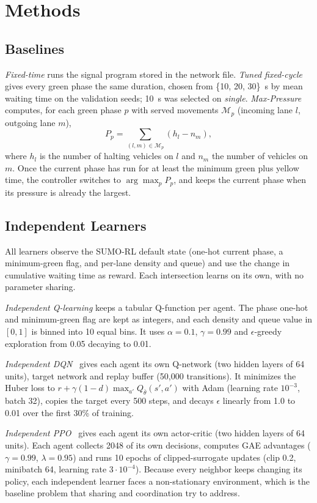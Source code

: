 \documentclass[conference]{IEEEtran}
\begin{document}
\section{Methods}
\label{sec:methods}
\subsection{Baselines}
\emph{Fixed-time} runs the signal program stored in the network file. \emph{Tuned fixed-cycle} gives every green phase the same duration, chosen from \{10, 20, 30\}~s by mean waiting time on the validation seeds; 10~s was selected on \emph{single}. \emph{Max-Pressure}~\cite{varaiya2013max} computes, for each green phase $p$ with served movements $\mathcal{M}_p$ (incoming lane $l$, outgoing lane $m$),
\begin{equation}
P_p = \sum_{(l,m)\in\mathcal{M}_p} \left( h_l - n_m \right),
\end{equation}
where $h_l$ is the number of halting vehicles on $l$ and $n_m$ the number of vehicles on $m$. Once the current phase has run for at least the minimum green plus yellow time, the controller switches to $\arg\max_p P_p$, and keeps the current phase when its pressure is already the largest.

\subsection{Independent Learners}
All learners observe the SUMO-RL default state (one-hot current phase, a minimum-green flag, and per-lane density and queue) and use the change in cumulative waiting time as reward. Each intersection learns on its own, with no parameter sharing.

\emph{Independent Q-learning} keeps a tabular Q-function per agent. The phase one-hot and minimum-green flag are kept as integers, and each density and queue value in $[0,1]$ is binned into 10 equal bins. It uses $\alpha=0.1$, $\gamma=0.99$ and $\epsilon$-greedy exploration from 0.05 decaying to 0.01.

\emph{Independent DQN}~\cite{mnih2015dqn} gives each agent its own Q-network (two hidden layers of 64 units), target network and replay buffer (50{,}000 transitions). It minimizes the Huber loss to $r + \gamma(1-d)\max_{a'} Q_{\bar\theta}(s',a')$ with Adam (learning rate $10^{-3}$, batch 32), copies the target every 500 steps, and decays $\epsilon$ linearly from 1.0 to 0.01 over the first 30\% of training.

\emph{Independent PPO}~\cite{schulman2017ppo} gives each agent its own actor-critic (two hidden layers of 64 units). Each agent collects 2048 of its own decisions, computes GAE advantages ($\gamma=0.99$, $\lambda=0.95$) and runs 10 epochs of clipped-surrogate updates (clip 0.2, minibatch 64, learning rate $3\cdot10^{-4}$). Because every neighbor keeps changing its policy, each independent learner faces a non-stationary environment, which is the baseline problem that sharing and coordination try to address.
\end{document}
